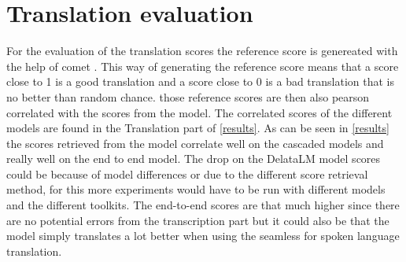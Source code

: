 \section{Translation evaluation}
For the evaluation of the translation scores the reference score is genereated with the help of comet \cite{rei-etal-2020-comet}. This way of generating the reference score means that a score close to 1 is a good translation and a score close to 0 is a bad translation that is no better than random chance.
those reference scores are then also pearson correlated with the scores from the model. The correlated scores of the different models are found in the Translation part of \autoref{results}. 
As can be seen in \autoref{results} the scores retrieved from the model correlate well on the cascaded models and really well on the end to end model. The drop on the DelataLM model scores could be because of model differences or due to the different score retrieval method, for this more experiments would have to be run with different models and the different toolkits. 
The end-to-end scores are that much higher since there are no potential errors from the transcription part but it could also be that the model simply translates a lot better when using the seamless for spoken language translation. 

